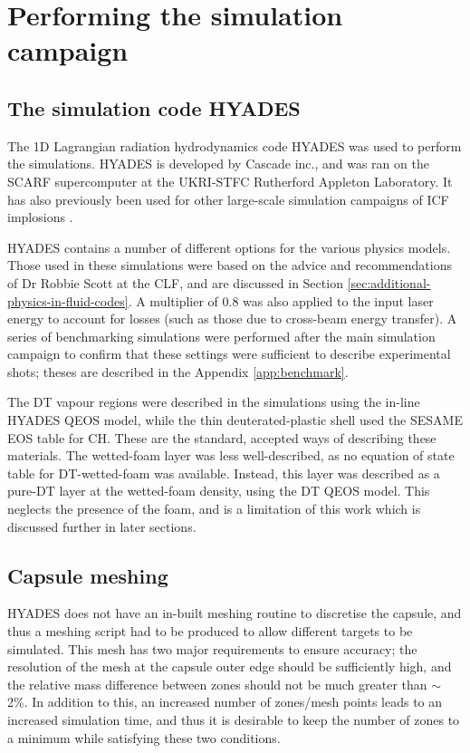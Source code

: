 \section{Performing the simulation campaign} \label{sec: OptimisationCampaign}

\subsection{The simulation code HYADES}

The 1D Lagrangian radiation hydrodynamics code HYADES was used to perform the simulations. HYADES is developed by Cascade inc., and was ran on the SCARF supercomputer at the UKRI-STFC Rutherford Appleton Laboratory. It has also previously been used for other large-scale simulation campaigns of ICF implosions \cite{Hatfield2019}. 

HYADES contains a number of different options for the various physics models. Those used in these simulations were based on the advice and recommendations of Dr Robbie Scott at the CLF, and are discussed in Section \ref{sec:additional-physics-in-fluid-codes}. A multiplier of 0.8 was also applied to the input laser energy to account for losses (such as those due to cross-beam energy transfer). A series of benchmarking simulations were performed after the main simulation campaign to confirm that these settings were sufficient to describe experimental shots; theses are described in the Appendix \ref{app:benchmark}.

The DT vapour regions were described in the simulations using the in-line HYADES QEOS model, while the thin deuterated-plastic shell used the SESAME EOS table for CH. These are the standard, accepted ways of describing these materials. The wetted-foam layer was less well-described, as no equation of state table for DT-wetted-foam was available. Instead, this layer was described as a pure-DT layer at the wetted-foam density, using the  DT QEOS model. This neglects the presence of the foam, and is a limitation of this work which is discussed further in later sections.

\subsection{Capsule meshing}

HYADES does not have an in-built meshing routine to discretise the capsule, and thus a meshing script had to be produced to allow different targets to be simulated. This mesh has two major requirements to ensure accuracy; the resolution of the mesh at the capsule outer edge should be sufficiently high, and the relative mass difference between zones should not be much greater than $\sim$ 2\%. In addition to this, an increased number of zones/mesh points leads to an increased simulation time, and thus it is desirable to keep the number of zones to a minimum while satisfying these two conditions.

